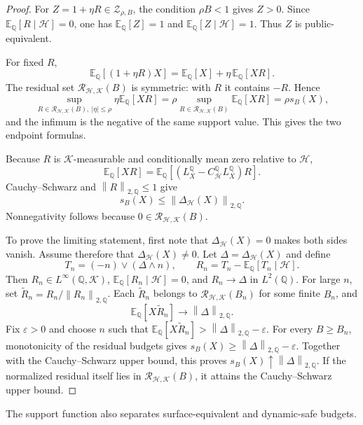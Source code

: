 \documentclass[11pt,a4paper]{amsart}
\theoremstyle{plain}
\theoremstyle{definition}
\theoremstyle{remark}
\newcommand{\QQ}{\mathbb{Q}}
\newcommand{\EE}{\mathbb{E}}
\newcommand{\cH}{\mathcal{H}}
\newcommand{\cK}{\mathcal{K}}
\newcommand{\cR}{\mathcal{R}}
\newcommand{\cZ}{\mathcal{Z}}
\newcommand{\eps}{\varepsilon}
\newcommand{\norm}[1]{\left\lVert #1\right\rVert}
\begin{document}
\begin{proof}
For \(Z=1+\eta R\in\cZ_{\rho,B}\), the condition \(\rho B<1\) gives \(Z>0\).  Since
\(\EE_\QQ[R\mid\cH]=0\), one has \(\EE_\QQ[Z]=1\) and
\(\EE_\QQ[Z\mid\cH]=1\).  Thus \(Z\) is public-equivalent.

For fixed \(R\),
\[
        \EE_\QQ[(1+\eta R)X]
        =
        \EE_\QQ[X]+\eta\,\EE_\QQ[XR].
\]
The residual set \(\cR_{\cH,\cK}(B)\) is symmetric: with \(R\) it contains \(-R\).  Hence
\[
        \sup_{R\in\cR_{\cH,\cK}(B),\ |\eta|\le\rho}
        \eta\EE_\QQ[XR]
        =
        \rho\sup_{R\in\cR_{\cH,\cK}(B)}\EE_\QQ[XR]
        =
        \rho s_B(X),
\]
and the infimum is the negative of the same support value.  This gives the two endpoint formulas.

Because \(R\) is \(\cK\)-measurable and conditionally mean zero relative to \(\cH\),
\[
        \EE_\QQ[XR]
        =
        \EE_\QQ[(L_X^\QQ-C_{\cH}^{\QQ}L_X^\QQ)R].
\]
Cauchy--Schwarz and \(\norm{R}_{2,\QQ}\le1\) give
\[
        s_B(X)\le \norm{\Delta_{\cH}(X)}_{2,\QQ}.
\]
Nonnegativity follows because \(0\in\cR_{\cH,\cK}(B)\).

To prove the limiting statement, first note that \(\Delta_{\cH}(X)=0\) makes both sides vanish.
Assume therefore that \(\Delta_{\cH}(X)\ne0\).  Let \(\Delta=\Delta_{\cH}(X)\) and define
\[
        T_n=(-n)\vee(\Delta\wedge n),
        \qquad
        R_n=T_n-\EE_\QQ[T_n\mid\cH].
\]
Then \(R_n\in L^\infty(\QQ,\cK)\), \(\EE_\QQ[R_n\mid\cH]=0\), and
\(R_n\to\Delta\) in \(L^2(\QQ)\).  For large \(n\), set
\(\widetilde R_n=R_n/\norm{R_n}_{2,\QQ}\).  Each \(\widetilde R_n\) belongs to
\(\cR_{\cH,\cK}(B_n)\) for some finite \(B_n\), and
\[
        \EE_\QQ[X\widetilde R_n]\to\norm{\Delta}_{2,\QQ}.
\]
Fix \(\eps>0\) and choose \(n\) such that
\(\EE_\QQ[X\widetilde R_n]>\norm{\Delta}_{2,\QQ}-\eps\).  For every
\(B\ge B_n\), monotonicity of the residual budgets gives
\(s_B(X)\ge \norm{\Delta}_{2,\QQ}-\eps\).  Together with the Cauchy--Schwarz upper bound, this proves
\(s_B(X)\uparrow\norm{\Delta}_{2,\QQ}\).  If the normalized residual itself lies in
\(\cR_{\cH,\cK}(B)\), it attains the Cauchy--Schwarz upper bound.
\end{proof}

The support function also separates surface-equivalent and dynamic-safe budgets.
\end{document}
